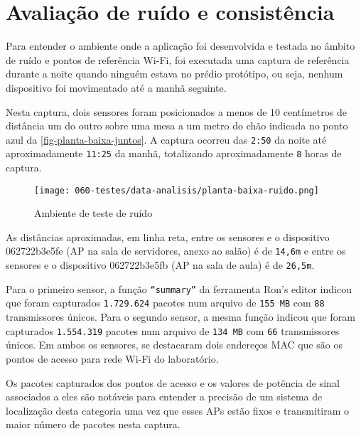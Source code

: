 \section{Avaliação de ruído e consistência}
\label{sec:teste-ruido}

Para entender o ambiente onde a aplicação foi desenvolvida e testada no âmbito
de ruído e pontos de referência Wi-Fi, foi executada uma captura de referência
durante a noite quando ninguém estava no prédio protótipo, ou seja, nenhum
dispositivo foi movimentado até a manhã seguinte.

Nesta captura, dois sensores foram posicionados a menos de 10 centímetros de
distância um do outro sobre uma mesa a um metro do chão indicada no ponto azul
da \autoref{fig-planta-baixa-juntos}. A captura ocorreu das \texttt{2:50} da
noite até aproximadamente \texttt{11:25} da manhã, totalizando aproximadamente
\texttt{8} horas de captura.

\begin{figure}[htb]
	\caption{\label{fig-planta-baixa-juntos}Ambiente de teste de ruído}
	\begin{center}
		\texttt{[image: 060-testes/data-analisis/planta-baixa-ruido.png]}
	\end{center}
\end{figure}

As distâncias aproximadas, em linha reta, entre os sensores e o dispositivo
062722b3e5fe (AP na sala de servidores, anexo ao salão) é de \texttt{14,6m} e
entre os sensores e o dispositivo 062722b3e5fb (AP na sala de aula) é de
\texttt{26,5m}.

Para o primeiro sensor, a função \texttt{``summary''}  da ferramenta Ron’s
editor indicou que foram capturados \texttt{1.729.624} pacotes num arquivo de
\texttt{155 MB} com \texttt{88} transmissores únicos. Para o segundo sensor, a
mesma função indicou que foram capturados \texttt{1.554.319} pacotes num arquivo
de \texttt{134 MB} com \texttt{66} transmissores únicos. Em ambos os sensores,
se destacaram dois endereços MAC que são os pontos de acesso para rede Wi-Fi do
laboratório.

Os pacotes capturados dos pontos de acesso e os valores de potência de sinal
associados a eles são notáveis para entender a precisão de um sistema de localização
desta categoria uma vez que esses APs estão fixos e transmitiram o
maior número de pacotes nesta captura.

